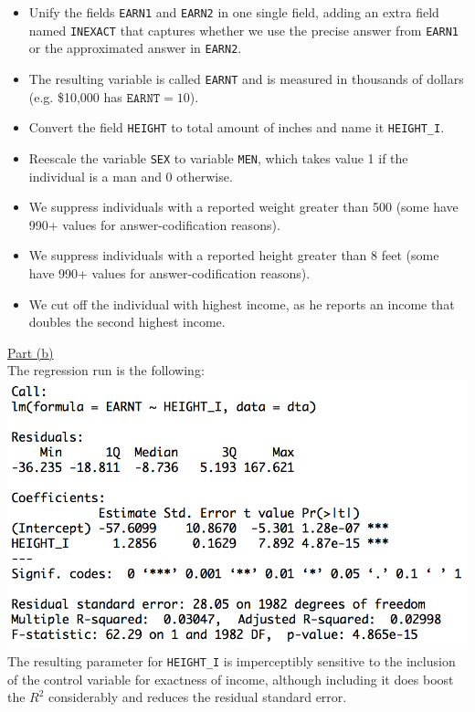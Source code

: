 \documentclass[a4paper, 11pt]{article}
\begin{document}
\begin{itemize}
\item Unify the fields \texttt{EARN1} and \texttt{EARN2} in one single field, adding an extra field named \texttt{INEXACT} that captures whether we use the precise answer from \texttt{EARN1} or the approximated answer in \texttt{EARN2}.
\item The resulting variable is called \texttt{EARNT} and is measured in thousands of dollars (e.g. \$10,000 has $\texttt{EARNT} = 10$).
\item Convert the field \texttt{HEIGHT} to total amount of inches and name it \texttt{HEIGHT\_I}.
\item Reescale the variable \texttt{SEX} to variable \texttt{MEN}, which takes value 1 if the individual is a man and 0 otherwise.
\item We suppress individuals with a reported weight greater than 500 (some have 990+ values for answer-codification reasons).
\item We suppress individuals with a reported height greater than 8 feet (some have 990+ values for answer-codification reasons).
\item We cut off the individual with highest income, as he reports an income that doubles the second highest income.
\end{itemize}
\underline{Part (b)}\\
\newline The regression run is the following:\\
\includegraphics[scale=0.7]{reg1.png}
\newline The resulting parameter for \texttt{HEIGHT\_I} is imperceptibly sensitive to the inclusion of the control variable for exactness of income, although including it does boost the $R^2$ considerably and reduces the residual standard error.\\
\end{document}
